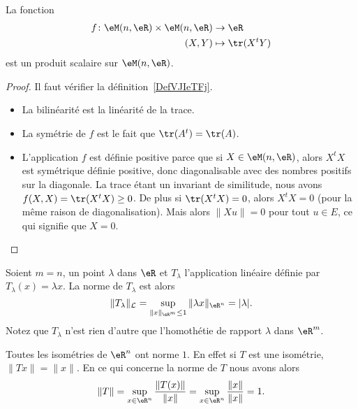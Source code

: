 \begin{proposition} \label{PropMAQoKAg}
	La fonction
	\begin{equation}
		\begin{aligned}
			f\colon \eM(n,\eR)\times \eM(n,\eR) & \to \eR           \\
			(X,Y)                               & \mapsto \tr(X^tY)
		\end{aligned}
	\end{equation}
	est un produit scalaire sur \( \eM(n,\eR)\).
\end{proposition}

\begin{proof}
	Il faut vérifier la définition~\ref{DefVJIeTFj}.
	\begin{itemize}
		\item La bilinéarité est la linéarité de la trace.
		\item La symétrie de \( f\) est le fait que \( \tr(A^t)=\tr(A)\).
		\item L'application \( f\) est définie positive parce que si \( X\in \eM(n,\eR)\), alors \( X^tX\) est symétrique définie positive, donc diagonalisable avec des nombres positifs sur la diagonale. La trace étant un invariant de similitude, nous avons \( f(X,X)=\tr(X^tX)\geq 0\). De plus si \( \tr(X^tX)=0\), alors \( X^tX=0\) (pour la même raison de diagonalisation). Mais alors \( \| Xu \|=0\) pour tout \( u\in E\), ce qui signifie que \( X=0\).
	\end{itemize}
\end{proof}

\begin{example}
	Soient \( m=n\), un point \( \lambda\) dans \( \eR\) et \( T_{\lambda}\) l'application linéaire définie par \( T_{\lambda}(x)=\lambda x\). La norme de \( T_{\lambda}\) est alors
	\[
		\|T_{\lambda}\|_{\mathcal{L}}=\sup_{\|x\|_{\eR^m}\leq 1}\|\lambda x\|_{\eR^n}= |\lambda|.
	\]
	Notez que \( T_{\lambda}\) n'est rien d'autre que l'homothétie de rapport \( \lambda\) dans \( \eR^m\).
\end{example}

\begin{example}
    Toutes les isométries de \( \eR^n\) ont norme \( 1\). En effet si \( T\) est une isométrie, \( \| Tx \|=\| x \|\). En ce qui concerne la norme de \( T\) nous avons alors
	\begin{equation}
		\| T \|=\sup_{x\in\eR^n}\frac{ \| T(x) \| }{ \| x \| }=\sup_{x\in\eR^n}\frac{ \| x \| }{ \| x \| }=1.
	\end{equation}
\end{example}


